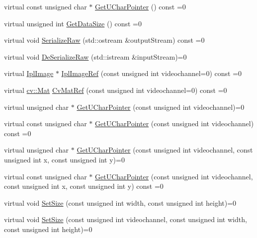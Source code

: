 \begin{DoxyCompactItemize}
\item 
virtual const unsigned char $\ast$ \hyperlink{classsvl_sample_image_a4527d6f63176444867741956c3fa902d}{Get\+U\+Char\+Pointer} () const =0
\item 
virtual unsigned int \hyperlink{classsvl_sample_image_a06557dd28b342027873fe82d4ca81196}{Get\+Data\+Size} () const =0
\item 
virtual void \hyperlink{classsvl_sample_image_ac8f36bed025509c4d9c77060413d9ece}{Serialize\+Raw} (std\+::ostream \&output\+Stream) const =0
\item 
virtual void \hyperlink{classsvl_sample_image_a377e3cc76c0a426b3acaae6f3a835723}{De\+Serialize\+Raw} (std\+::istream \&input\+Stream)=0
\item 
virtual \hyperlink{svl_types_8h_aa5a40a13021ba9708bfe921e18fdfa53}{Ipl\+Image} $\ast$ \hyperlink{classsvl_sample_image_a186f2ed3f98059785a8ec9de5dd55ec6}{Ipl\+Image\+Ref} (const unsigned int videochannel=0) const =0
\item 
virtual \hyperlink{namespacecv_a60d81b54f4914bec4cc4a72ab77eb444}{cv\+::\+Mat} \hyperlink{classsvl_sample_image_a6f6b8f9491bb9effdda7a42023208b9f}{Cv\+Mat\+Ref} (const unsigned int videochannel=0) const =0
\item 
virtual unsigned char $\ast$ \hyperlink{classsvl_sample_image_a197092f84532696829338eeef8c961fb}{Get\+U\+Char\+Pointer} (const unsigned int videochannel)=0
\item 
virtual const unsigned char $\ast$ \hyperlink{classsvl_sample_image_aa5e8009157462ed2b4a2b9a6733057b7}{Get\+U\+Char\+Pointer} (const unsigned int videochannel) const =0
\item 
virtual unsigned char $\ast$ \hyperlink{classsvl_sample_image_a5290dc4e28f8e5221d745bdf11523168}{Get\+U\+Char\+Pointer} (const unsigned int videochannel, const unsigned int x, const unsigned int y)=0
\item 
virtual const unsigned char $\ast$ \hyperlink{classsvl_sample_image_a75e4980f2dbffab07a44da67fdf1f3d6}{Get\+U\+Char\+Pointer} (const unsigned int videochannel, const unsigned int x, const unsigned int y) const =0
\item 
virtual void \hyperlink{classsvl_sample_image_a7092189a385c234da3d96dce9fe8958a}{Set\+Size} (const unsigned int width, const unsigned int height)=0
\item 
virtual void \hyperlink{classsvl_sample_image_a2bb1c673c435a89029fb0809cc740e0d}{Set\+Size} (const unsigned int videochannel, const unsigned int width, const unsigned int height)=0
\item 

\end{DoxyCompactItemize}
